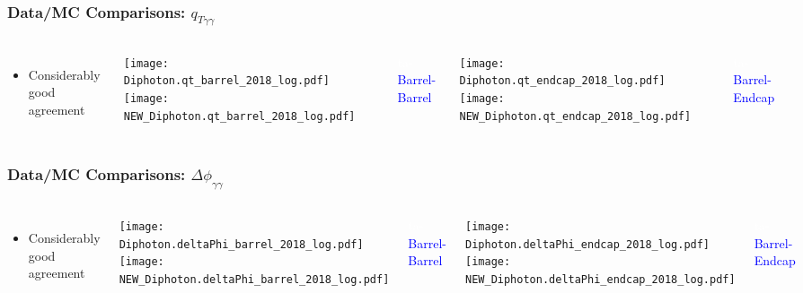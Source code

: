 \documentclass{beamer}
\newcommand\Wider[2][3em]{%
\makebox[\linewidth][c]{%
  \begin{minipage}{\dimexpr\textwidth+#1\relax}
  \raggedright#2
  \end{minipage}%
  }%
}
\begin{document}
\begin{frame}[t]
\frametitle{Data/MC Comparisons: $q_{T\gamma\gamma}$}
\begin{columns}[T]
  \begin{itemize}
    \item {\footnotesize \raggedleft Considerably good agreement}
  \end{itemize}

\Wider[2.9em]{
\raggedleft
\rotatebox{90}{\parbox{4cm}{\raggedleft \small{\textcolor{blue}{Full 2018 dataset}}}}\\
}
\Wider[3.4em]{
\raggedleft
\rotatebox{90}{\parbox{4cm}{\raggedleft \small{\textcolor{blue}{New 2018 data}}}}
}

\texttt{[image: Diphoton.qt\_barrel\_2018\_log.pdf]}
\texttt{[image: NEW\_Diphoton.qt\_barrel\_2018\_log.pdf]}
\caption{\textcolor{white}{ta-} \textcolor{blue}{\small {Barrel-Barrel}}}

\texttt{[image: Diphoton.qt\_endcap\_2018\_log.pdf]}
\texttt{[image: NEW\_Diphoton.qt\_endcap\_2018\_log.pdf]}
\caption{\textcolor{white}{ta-} \textcolor{blue}{\small {Barrel-Endcap}}}
\end{columns}
\end{frame}

\begin{frame}[t]
\frametitle{Data/MC Comparisons: $\Delta\phi_{\gamma\gamma}$}
\begin{columns}[T]
  \begin{itemize}
    \item {\footnotesize \raggedleft Considerably good agreement}
  \end{itemize}

\Wider[2.9em]{
\raggedleft
\rotatebox{90}{\parbox{4cm}{\raggedleft \small{\textcolor{blue}{Full 2018 dataset}}}}\\
}
\Wider[3.4em]{
\raggedleft
\rotatebox{90}{\parbox{4cm}{\raggedleft \small{\textcolor{blue}{New 2018 data}}}}
}

\texttt{[image: Diphoton.deltaPhi\_barrel\_2018\_log.pdf]}
\texttt{[image: NEW\_Diphoton.deltaPhi\_barrel\_2018\_log.pdf]}
\caption{\textcolor{white}{ta-} \textcolor{blue}{\small {Barrel-Barrel}}}

\texttt{[image: Diphoton.deltaPhi\_endcap\_2018\_log.pdf]}
\texttt{[image: NEW\_Diphoton.deltaPhi\_endcap\_2018\_log.pdf]}
\caption{\textcolor{white}{ta-} \textcolor{blue}{\small {Barrel-Endcap}}}
\end{columns}
\end{frame}
\end{document}
